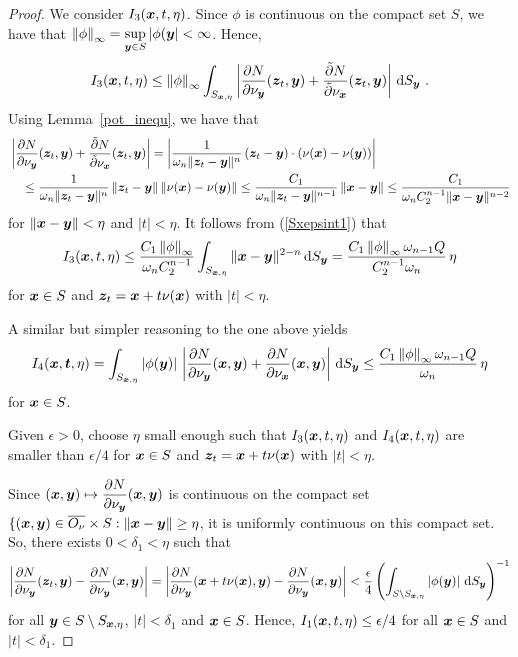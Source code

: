 \begin{proof}
 We consider $I_3({\bm{x}},t,\eta)$.
Since $\phi$ is continuous on the compact set $S$, we have that
$\displaystyle
\left\|\phi\right\|_{\infty} = \sup_{{\bm{y}}\in S}|\phi({\bm{y}}| < \infty$.
Hence,
\[
I_3({\bm{x}},t,\eta)
\leq \left\|\phi\right\|_{\infty} \int_{S_{{\bm{x}},\eta}}
\left| \frac{\partial{N}}{\partial \nu_{{\bm{y}}}}({\bm{z}}_t,{\bm{y}}) +
\frac{\tilde{\partial}{N}}{\tilde{\partial}{\nu_{{\bm{x}}}}}({\bm{z}}_t,{\bm{y}})\right| \,\mathrm{d}{S}_{{\bm{y}}} \  .
\]
Using Lemma~\ref{pot_inequ}, we have that
\begin{align*}
&\left| \frac{\partial{N}}{\partial \nu_{{\bm{y}}}}({\bm{z}}_t,{\bm{y}}) +
\frac{\tilde{\partial}{N}}{\tilde{\partial}{\nu_{{\bm{x}}}}}({\bm{z}}_t,{\bm{y}})\right|
= \left| \frac{1}{\omega_n \|{\bm{z}}_t-{\bm{y}}\|^n}\,({\bm{z}}_t-{\bm{y}})\cdot
(\nu({\bm{x}}) - \nu({\bm{y}})) \right| \\
&\quad
\leq \frac{1}{\omega_n \|{\bm{z}}_t-{\bm{y}}\|^n}\,\|{\bm{z}}_t-{\bm{y}}\|\,
\|\nu({\bm{x}}) - \nu({\bm{y}})\|
\leq \frac{C_1}{\omega_n \|{\bm{z}}_t-{\bm{y}}\|^{n-1}}\,\|{\bm{x}}-{\bm{y}}\|
\leq \frac{C_1}{\omega_n C_2^{n-1}\|{\bm{x}}-{\bm{y}}\|^{n-2}}
\end{align*}
for $\|{\bm{x}} - {\bm{y}}\| < \eta$ and $|t| < \eta$.  It follows from
(\ref{Sxepsint1}) that
\[
I_3({\bm{x}},t,\eta)
\leq \frac{C_1 \left\|\phi\right\|_{\infty}}{\omega_n C_2^{n-1}}
\int_{S_{{\bm{x}},\eta}} \|{\bm{x}}-{\bm{y}}\|^{2-n} \,\mathrm{d}{S}_{{\bm{y}}}
= \frac{C_1 \left\|\phi\right\|_{\infty} \omega_{n-1} Q}{C_2^{n-1}\omega_n}
\, \eta
\]
for ${\bm{x}} \in S$ and
${\bm{z}}_t = {\bm{x}}+t\nu({\bm{x}})$ with $|t|< \eta$.

 A similar but simpler reasoning to the one above yields
\[
I_4({\bm{x}},{\bm{t}},\eta)
= \int_{S_{{\bm{x}},\eta}} \left|\phi({\bm{y}})\right|\,
\left| \frac{\partial{N}}{\partial \nu_{{\bm{y}}}}({\bm{x}},{\bm{y}}) +
\frac{\partial{N}}{\partial \nu_{{\bm{x}}}}({\bm{x}},{\bm{y}})\right| \,\mathrm{d}{S}_{{\bm{y}}}
\leq \frac{C_1 \left\|\phi\right\|_{\infty}\omega_{n-1} Q}{\omega_n}\, \eta
\]
for ${\bm{x}} \in S$.

 Given $\epsilon > 0$, choose $\eta$ small enough such that
$I_3({\bm{x}},t,\eta)$ and $I_4({\bm{x}},t,\eta)$ are smaller
than $\epsilon/4$ for ${\bm{x}} \in S$ and
${\bm{z}}_t = {\bm{x}}+t\nu({\bm{x}})$ with $|t|< \eta$.

Since $\displaystyle ({\bm{x}},{\bm{y}}) \mapsto
\frac{\partial{N}}{\partial \nu_{{\bm{y}}}}({\bm{x}},{\bm{y}})$ is
continuous on the compact set
$\{({\bm{x}},{\bm{y}}) \in \overline{O_\nu} \times S :
\|{\bm{x}} - {\bm{y}}\| \geq \eta$,
it is uniformly continuous on this compact set.  So, there exists
$0 < \delta_1 < \eta$ such that
\[
\left| \frac{\partial{N}}{\partial \nu_{{\bm{y}}}}({\bm{z}}_t,{\bm{y}}) -
\frac{\partial{N}}{\partial \nu_{{\bm{y}}}}({\bm{x}},{\bm{y}})\right|
=\left| \frac{\partial{N}}{\partial \nu_{{\bm{y}}}}({\bm{x}} + t \nu({\bm{x}}),{\bm{y}}) -
\frac{\partial{N}}{\partial \nu_{{\bm{y}}}}({\bm{x}},{\bm{y}})\right|
< \frac{\epsilon}{4} \left(
\int_{S\setminus S_{{\bm{x}},\eta}}\left|\phi({\bm{y}})\right|
\,\mathrm{d}{S}_{{\bm{y}}} \right)^{-1}
\]
for all $\displaystyle {\bm{y}} \in S \setminus S_{{\bm{x}},\eta}$,
$|t| < \delta_1$ and ${\bm{x}} \in S$.
Hence,
$\displaystyle I_1({\bm{x}},t,\eta) \leq \epsilon/4$ for all ${\bm{x}} \in S$
and $|t| < \delta_1$.


\end{proof}
